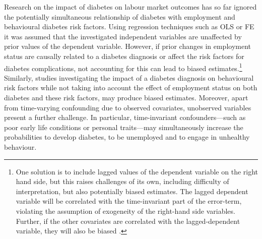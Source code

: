Research on the impact of diabetes on labour market outcomes has so far ignored the potentially simultaneous relationship of diabetes with employment and behavioural diabetes risk factors. Using regression techniques such as \ac{OLS} or \ac{FE} it was assumed that the investigated independent variables are unaffected by prior values of the dependent variable. However, if prior changes in employment status are causally related to a diabetes diagnosis or affect the risk factors for diabetes complications, not accounting for this can lead to biased estimates.\footnote{One solution is to include lagged values of the dependent variable on the right hand side, but this raises challenges of its own, including difficulty of interpretation, but also potentially biased estimates. The lagged dependent variable will be correlated with the time-invariant part of the error-term, violating the assumption of exogeneity of the right-hand side variables. Further, if the other covariates are correlated with the lagged-dependent variable, they will also be biased \parencite{Anderson1982,Nickell1981}.} Similarly, studies investigating the impact of a diabetes diagnosis on behavioural risk factors while not taking into account the effect of employment status on both diabetes and these risk factors, may produce biased estimates. Moreover, apart from time-varying confounding due to observed covariates, unobserved variables present a further challenge. In particular, time-invariant confounders---such as poor early life conditions or personal traits---may simultaneously increase the probabilities to develop diabetes, to be unemployed and to engage in unhealthy behaviour. 

